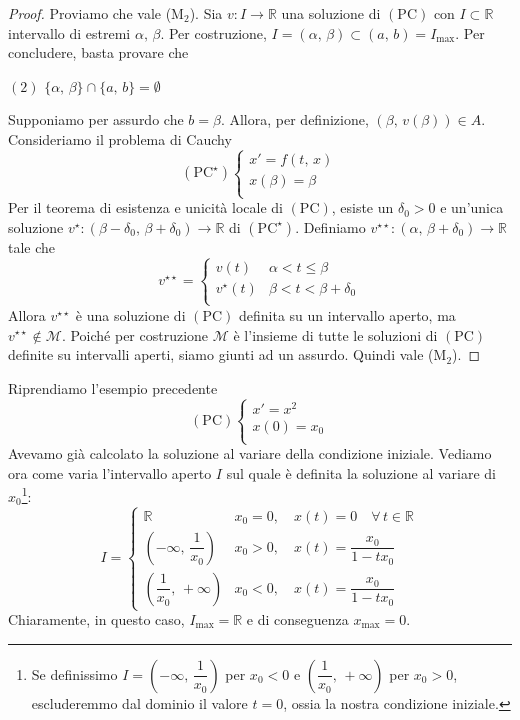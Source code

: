 \begin{proof}
Proviamo che vale \textnormal{(M$_2$)}. Sia $v : I \longrightarrow \mathbb{R}$ una soluzione di $\mathrm{(PC)}$ con $I \subset \mathbb{R}$ intervallo di estremi $\alpha,\,\beta$. Per costruzione, $I = (\alpha,\,\beta) \subset (a,\,b) = I_{\max}$. Per concludere, basta provare che
\begin{center}
$\mathrm{(2)}$
\hfill
$\displaystyle
\lbrace \alpha,\,\beta \rbrace \cap \lbrace a,\,b \rbrace = \emptyset
$
\hfill \null \\
\end{center}
Supponiamo per assurdo che $b = \beta$. Allora, per definizione, $(\beta,\,v(\beta)) \in A$. Consideriamo il problema di Cauchy
$$
\mathrm{(PC^{\star})}
\begin{cases}
x' = f(t,\,x)\\
x(\beta) = \beta\\
\end{cases}
$$
Per il teorema di esistenza e unicità locale di $\mathrm{(PC)}$, esiste un $\delta_0 > 0$ e un'unica soluzione $v^{\star} : (\beta-\delta_0,\,\beta+\delta_0) \longrightarrow \mathbb{R}$ di $\mathrm{(PC^{\star})}$. Definiamo $v^{\star\star} : (\alpha,\,\beta+\delta_0) \longrightarrow \mathbb{R}$ tale che
$$
v^{\star\star} =
\begin{cases}
v(t) & \alpha < t \leq \beta\\
v^{\star}(t) & \beta < t < \beta+\delta_0\\
\end{cases}
$$
Allora $v^{\star\star}$ è una soluzione di $\mathrm{(PC)}$ definita su un intervallo aperto, ma $v^{\star\star} \notin \mathscr{M}$. Poiché per costruzione $\mathscr{M}$ è l'insieme di tutte le soluzioni di $\mathrm{(PC)}$ definite su intervalli aperti, siamo giunti ad un assurdo. Quindi vale \textnormal{(M$_2$)}.
\end{proof}

\begin{example}
Riprendiamo l'esempio precedente
$$
\mathrm{(PC)}
\begin{cases}
x' = x^2\\
x(0) = x_0\\
\end{cases}
$$
Avevamo già calcolato la soluzione al variare della condizione iniziale. Vediamo ora come varia l'intervallo aperto $I$ sul quale è definita la soluzione al variare di $x_0$\footnote{
Se definissimo $I = \left( -\infty,\,\dfrac{1}{x_0} \right)$ per $x_0 < 0$ e $\left( \dfrac{1}{x_0},\,+\infty \right)$ per $x_0 > 0$, escluderemmo dal dominio il valore $t=0$, ossia la nostra condizione iniziale.
}:
$$
I =
\begin{cases}
\mathbb{R} & x_0 = 0, \quad x(t) = 0 \quad \forall \, t \in \mathbb{R}\\
\left( -\infty,\,\dfrac{1}{x_0} \right) & x_0 > 0, \quad x(t) = \dfrac{x_0}{1-tx_0}\\
\left( \dfrac{1}{x_0},\,+\infty \right) & x_0 < 0, \quad x(t) = \dfrac{x_0}{1-tx_0}
\end{cases}
$$
Chiaramente, in questo caso, $I_{\max} = \mathbb{R}$ e di conseguenza $x_{\max} = 0$.
\end{example}



